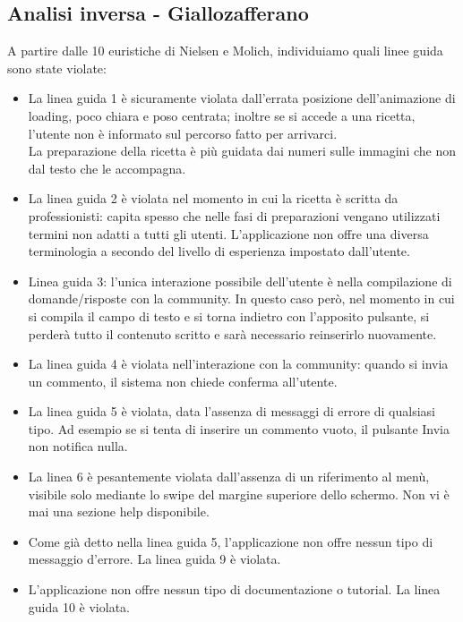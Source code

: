 \subsection*{Analisi inversa - Giallozafferano}

A partire dalle 10 euristiche di Nielsen e Molich, individuiamo quali linee guida sono state violate:

\begin{itemize}
\item La linea guida 1 è sicuramente violata dall'errata posizione dell'animazione di loading, poco chiara e poso centrata; inoltre se si accede a una ricetta, l'utente non è informato sul percorso fatto per arrivarci.\\La preparazione della ricetta è più guidata dai numeri sulle immagini che non dal testo che le accompagna.

\item La linea guida 2 è violata nel momento in cui la ricetta è scritta da professionisti: capita spesso che nelle fasi di preparazioni vengano utilizzati termini non adatti a tutti gli utenti. L'applicazione non offre una diversa terminologia a secondo del livello di esperienza impostato dall'utente.

\item Linea guida 3: l'unica interazione possibile dell'utente è nella compilazione di domande/risposte con la community. In questo caso però, nel momento in cui si compila il campo di testo e si torna indietro con l'apposito pulsante, si perderà tutto il contenuto scritto e sarà necessario reinserirlo nuovamente.

\item La linea guida 4 è violata nell'interazione con la community: quando si invia un commento, il sistema non chiede conferma all'utente.

\item La linea guida 5  è violata, data l'assenza di messaggi di errore di qualsiasi tipo. Ad esempio se si tenta di inserire un commento vuoto, il pulsante Invia non notifica nulla.

\item La linea 6 è pesantemente violata dall'assenza di un riferimento al menù, visibile solo mediante lo swipe del margine superiore dello schermo. Non vi è mai una sezione help disponibile.

\item Come già detto nella linea guida 5, l'applicazione non offre nessun tipo di messaggio d'errore. La linea guida 9 è violata.

\item L'applicazione non offre nessun tipo di documentazione o tutorial. La linea guida 10 è violata.
\end{itemize}

